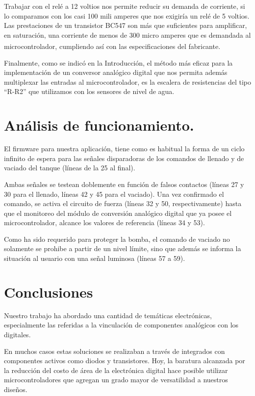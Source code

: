 \documentclass[a4paper]{article}
\let\originalcite\cite
\renewcommand{\cite}[2][]{\textsuperscript{\originalcite{#2}}}
\begin{document}
Trabajar con el relé a 12 voltios nos permite reducir 
su demanda de corriente, si lo comparamos con los casi 
100 mili amperes que nos exigiría un relé de 5 voltios. 
Las prestaciones de un transistor BC547 son más que 
suficientes para amplificar, en saturación, una corriente
de menos de 300 micro amperes que es demandada al 
microcontrolador, cumpliendo así con las especificaciones 
del fabricante\cite{bib:datasheet}.

Finalmente, como se indicó en la Introducción, el método
más eficaz para la implementación de un conversor 
analógico digital que nos permita además multiplexar las
entradas al microcontrolador, es la escalera de 
resistencias del tipo ``R-R2'' que utilizamos con los 
sensores de nivel de agua.

\section{Análisis de funcionamiento.}

El firmware para nuestra aplicación, tiene como es 
habitual la forma de un ciclo infinito de espera para 
las señales disparadoras de los comandos de llenado y de 
vaciado del tanque (líneas de la 25 al final).

Ambas señales se testean doblemente en función de falsos
contactos (líneas 27 y 30 para el llenado, líneas 42 y 45 
para el vaciado). Una vez confirmado el comando, se activa
el circuito de fuerza (líneas 32 y 50, respectivamente) 
hasta que el monitoreo del módulo de conversión analógico 
digital que ya posee el microcontrolador, alcance los 
valores de referencia (líneas 34 y 53).

Como ha sido requerido para proteger la bomba, el comando
de vaciado no solamente se prohibe a partir de un nivel
límite, sino que además se informa la situación al usuario
con una señal luminosa (líneas 57 a 59).

\section{Conclusiones}

Nuestro trabajo ha abordado una cantidad de temáticas 
electrónicas, especialmente las referidas a la vinculación
de componentes analógicos con los digitales.

En muchos casos estas soluciones se realizaban a través 
de integrados con componentes activos como
diodos y transistores. Hoy, la baratura alcanzada por 
la reducción del costo de área de la electrónica digital
hace posible utilizar microcontroladores que agregan un
grado mayor de versatilidad a nuestros diseños.
\end{document}

